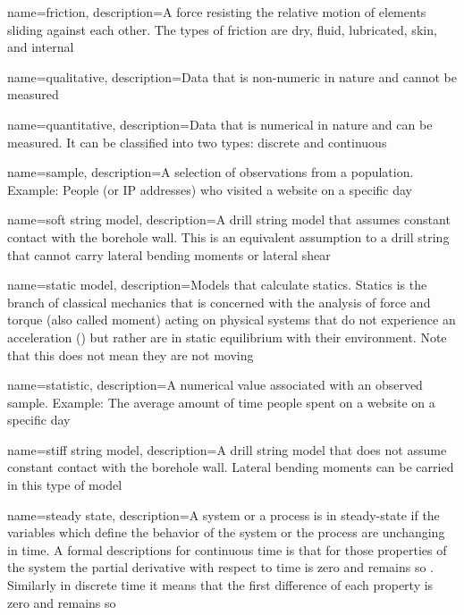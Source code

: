 {
	name=friction,
	description={A force resisting the relative motion of elements sliding against each other.  The types of friction are dry, fluid, lubricated, skin, and internal}
}

{
	name=qualitative,
	description={Data that is non-numeric in nature and cannot be measured}
}

{
	name=quantitative,
	description={Data that is numerical in nature and can be measured.  It can be classified into two types: discrete and continuous}
}

{
	name=sample,
	description={A selection of observations from a population.  Example: People (or IP addresses) who visited a website on a specific day}
}

{
	name=soft string model,
	description={A drill string model that assumes constant contact with the borehole wall.  This is an equivalent assumption to a drill string that cannot carry lateral bending moments or lateral shear}
}

{
	name=static model,
	description=Models that calculate statics.  Statics is the branch of classical mechanics that is concerned with the analysis of force and torque (also called moment) acting on physical systems that do not experience an acceleration (\staticforcebalance)\comma{} but rather\comma{} are in static equilibrium with their environment.  Note that this does not mean they are not moving
}

{
	name=statistic,
	description={A numerical value associated with an observed sample.  Example: The average amount of time people spent on a website on a specific day}
}

{
	name=stiff string model,
	description={A drill string model that does not assume constant contact with the borehole wall.  Lateral bending moments can be carried in this type of model}
}

{
	name=steady state,
	description=A system or a process is in steady-state if the variables which define the behavior of the system or the process are unchanging in time.  A formal descriptions for continuous time\comma{} is that for those properties \systemproperty{} of the system\comma{} the partial derivative with respect to time is zero and remains so \continuoussteadystate{}.  Similarly\comma{} in discrete\comma{} time it means that the first difference of each property is zero and remains so \discretesteadystate{}
}

